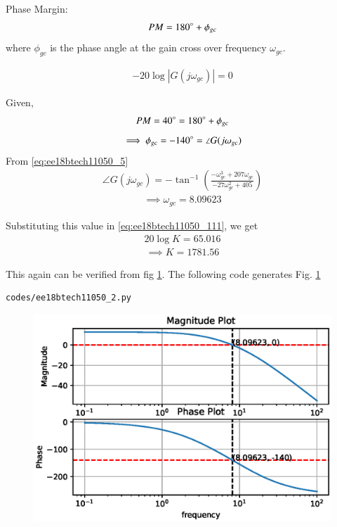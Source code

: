 \begin{enumerate}[label=\thesection.\arabic*.,ref=\thesection.\theenumi]
Phase Margin:
\begin{align}
    PM = 180\degree + \phi_{gc}
    \label{eq:ee18btech11050_7}
\end{align}
where $\phi_{gc}$ is the phase angle at the gain cross over frequency $\omega_{gc}$.

\begin{align}
    -20\log{|G(j\omega_{gc})|} = 0
    \label{eq:ee18btech11050_111}
\end{align}

Given,
\begin{align}
    PM = 40\degree = 180\degree + \phi_{gc}
    \label{eq:ee18btech11050_8}
\end{align}
\begin{align}
    \implies \phi_{gc} = -140\degree = \angle{G(j\omega_{gc})}
\end{align}
From \eqref{eq:ee18btech11050_5} 
\begin{align}
    \angle{G(j\omega_{gc})} = -\tan^{-1}(\frac{-\omega_{gc}^3+207\omega_{gc}}{-27\omega_{gc}^2+405})
    \label{eq:ee18btech11050_9}
\end{align}
\begin{align}
    \implies \omega_{gc} = 8.09623
    \label{eq:ee18btech11050_10}
\end{align}

Substituting this value in \eqref{eq:ee18btech11050_111}, we get
\begin{align}
    20\log{K} = 65.016
\end{align}
\begin{align}
    \implies K = 1781.56
    \label{eq:ee18btech11050_12}
\end{align}

This again can be verified from fig \ref{fig:ee18btech11050_fig3}.
The following code generates Fig. \ref{fig:ee18btech11050_fig3}
\begin{lstlisting}
codes/ee18btech11050_2.py
\end{lstlisting}
\begin{figure}[!ht]
\centering
\includegraphics[width=\columnwidth]{./figs/ee18btech11050_2.eps}
\caption{}
\label{fig:ee18btech11050_fig3}
\end{figure}


\end{enumerate}
